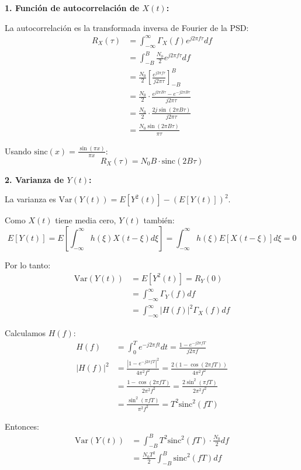 \documentclass[10pt,a4paper]{article}
\begin{document}
\begin{solucion}
\textbf{1. Función de autocorrelación de $X(t)$:}

La autocorrelación es la transformada inversa de Fourier de la PSD:
\begin{align*}
R_X(\tau) &= \int_{-\infty}^{\infty} \Gamma_X(f) e^{j2\pi f\tau} df\\
&= \int_{-B}^{B} \frac{N_0}{2} e^{j2\pi f\tau} df\\
&= \frac{N_0}{2} \left[\frac{e^{j2\pi f\tau}}{j2\pi \tau}\right]_{-B}^{B}\\
&= \frac{N_0}{2} \cdot \frac{e^{j2\pi B\tau} - e^{-j2\pi B\tau}}{j2\pi \tau}\\
&= \frac{N_0}{2} \cdot \frac{2j \sin(2\pi B\tau)}{j2\pi \tau}\\
&= \frac{N_0 \sin(2\pi B\tau)}{\pi \tau}
\end{align*}

Usando $\text{sinc}(x) = \frac{\sin(\pi x)}{\pi x}$:
\[
\boxed{R_X(\tau) = N_0 B \cdot \text{sinc}(2B\tau)}
\]

\textbf{2. Varianza de $Y(t)$:}

La varianza es $\text{Var}(Y(t)) = E[Y^2(t)] - (E[Y(t)])^2$.

Como $X(t)$ tiene media cero, $Y(t)$ también:
\[
E[Y(t)] = E\left[\int_{-\infty}^{\infty} h(\xi) X(t-\xi) d\xi\right] = \int_{-\infty}^{\infty} h(\xi) E[X(t-\xi)] d\xi = 0
\]

Por lo tanto:
\begin{align*}
\text{Var}(Y(t)) &= E[Y^2(t)] = R_Y(0)\\
&= \int_{-\infty}^{\infty} \Gamma_Y(f) df\\
&= \int_{-\infty}^{\infty} |H(f)|^2 \Gamma_X(f) df
\end{align*}

Calculamos $H(f)$:
\begin{align*}
H(f) &= \int_0^T e^{-j2\pi ft} dt = \frac{1 - e^{-j2\pi fT}}{j2\pi f}\\
|H(f)|^2 &= \frac{|1 - e^{-j2\pi fT}|^2}{4\pi^2 f^2} = \frac{2(1 - \cos(2\pi fT))}{4\pi^2 f^2}\\
&= \frac{1 - \cos(2\pi fT)}{2\pi^2 f^2} = \frac{2\sin^2(\pi fT)}{2\pi^2 f^2}\\
&= \frac{\sin^2(\pi fT)}{\pi^2 f^2} = T^2 \text{sinc}^2(fT)
\end{align*}

Entonces:
\begin{align*}
\text{Var}(Y(t)) &= \int_{-B}^{B} T^2 \text{sinc}^2(fT) \cdot \frac{N_0}{2} df\\
&= \frac{N_0 T^2}{2} \int_{-B}^{B} \text{sinc}^2(fT) df
\end{align*}


\end{solucion}
\end{document}
